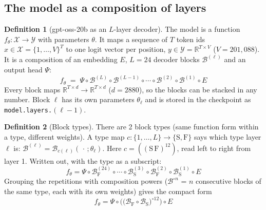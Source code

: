 \documentclass[10pt,a4paper]{article}
\theoremstyle{definition}
\newtheorem{definition}{Definition}[section]
\begin{document}
\subsection{The model as a composition of layers}\label{sec:comp}
\begin{definition}[gpt-oss-20b as an $L$-layer decoder]
The model is a function $f_\theta:\mathcal{X}\to\mathcal{Y}$ with parameters $\theta$. It maps a sequence of $T$ token ids $x\in\mathcal{X}=\{1,\dots,V\}^{T}$ to one logit vector per position, $y\in\mathcal{Y}=\mathbb{R}^{T\times V}$ ($V=201{,}088$). It is a composition of an embedding $E$, $L=24$ decoder blocks $\mathcal{B}^{(\ell)}$ and an output head $\Psi$:
\begin{equation}
  f_\theta \;=\; \Psi\circ\mathcal{B}^{(L)}\circ\mathcal{B}^{(L-1)}\circ\cdots\circ\mathcal{B}^{(2)}\circ\mathcal{B}^{(1)}\circ E
\end{equation}
Every block maps $\mathbb{R}^{T\times d}\to\mathbb{R}^{T\times d}$ ($d=2880$), so the blocks can be stacked in any number. Block $\ell$ has its own parameters $\theta_\ell$ and is stored in the checkpoint as \texttt{model.layers.}$(\ell-1)$.
\end{definition}
\begin{definition}[Block types]
There are 2 block types (same function form within a type, different weights). A type map $c:\{1,\dots,L\}\to\{\mathrm{S},\mathrm{F}\}$ says which type layer $\ell$ is: $\mathcal{B}^{(\ell)}=\mathcal{B}_{c(\ell)}(\,\cdot\,;\theta_\ell)$. Here $c=((\mathrm{S}\,\mathrm{F})^{12})$, read left to right from layer 1.
Written out, with the type as a subscript:
\begin{equation}
  f_\theta = \Psi\circ \mathcal{B}^{(24)}_{\mathrm{F}}\circ \cdots\circ \mathcal{B}^{(3)}_{\mathrm{S}}\circ \mathcal{B}^{(2)}_{\mathrm{F}}\circ \mathcal{B}^{(1)}_{\mathrm{S}}\circ E
\end{equation}
Grouping the repetitions with composition powers ($\mathcal{B}^{\circ n}$ = $n$ consecutive blocks of the same type, each with its own weights) gives the compact form
\begin{equation}\label{eq:compact}
  f_\theta = \Psi\circ\Big(\big(\mathcal{B}_{\mathrm{F}} \circ \mathcal{B}_{\mathrm{S}}\big)^{\circ 12}\Big)\circ E
\end{equation}
\end{definition}
\end{document}
